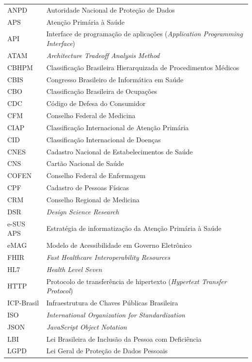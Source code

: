 \begin{longtable}{L{2.6cm} L{12.4cm}}
ANPD & Autoridade Nacional de Proteção de Dados \\
APS & Atenção Primária à Saúde \\
API & Interface de programação de aplicações (\textit{Application Programming Interface}) \\
ATAM & \textit{Architecture Tradeoff Analysis Method} \\
CBHPM & Classificação Brasileira Hierarquizada de Procedimentos Médicos \\
CBIS & Congresso Brasileiro de Informática em Saúde \\
CBO & Classificação Brasileira de Ocupações \\
CDC & Código de Defesa do Consumidor \\
CFM & Conselho Federal de Medicina \\
CIAP & Classificação Internacional de Atenção Primária \\
CID & Classificação Internacional de Doenças \\
CNES & Cadastro Nacional de Estabelecimentos de Saúde \\
CNS & Cartão Nacional de Saúde \\
COFEN & Conselho Federal de Enfermagem \\
CPF & Cadastro de Pessoas Físicas \\
CRM & Conselho Regional de Medicina \\
DSR & \textit{Design Science Research} \\
e-SUS APS & Estratégia de informatização da Atenção Primária à Saúde \\
eMAG & Modelo de Acessibilidade em Governo Eletrônico \\
FHIR & \textit{Fast Healthcare Interoperability Resources} \\
HL7 & \textit{Health Level Seven} \\
HTTP & Protocolo de transferência de hipertexto (\textit{Hypertext Transfer Protocol}) \\
ICP-Brasil & Infraestrutura de Chaves Públicas Brasileira \\
ISO & \textit{International Organization for Standardization} \\
JSON & \textit{JavaScript Object Notation} \\
LBI & Lei Brasileira de Inclusão da Pessoa com Deficiência \\
LGPD & Lei Geral de Proteção de Dados Pessoais \\

\end{longtable}
